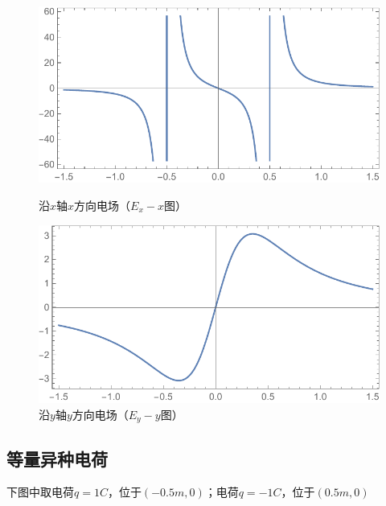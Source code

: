 \begin{figure}[H]
\begin{minipage}[b]{0.4\linewidth}
\centering
\includegraphics[width=\textwidth]{pic_data/T/Ex-x.pdf}
\caption{沿$x$轴$x$方向电场（$E_x - x$图）}
\end{minipage}
\hfill
\begin{minipage}[b]{0.4\linewidth}
\centering
\includegraphics[width=\textwidth]{pic_data/T/Ey-y.pdf}
\caption{沿$y$轴$y$方向电场（$E_y - y$图）}
\end{minipage}
\end{figure}

\subsection{等量异种电荷}

下图中取电荷$q=1C$，位于$(-0.5m,0)$；电荷$q=-1C$，位于$(0.5m,0)$

